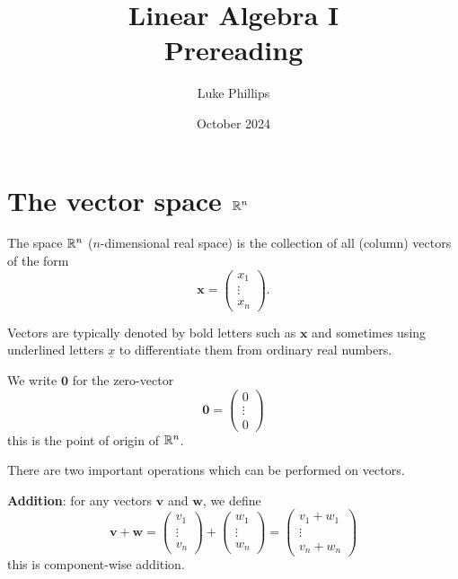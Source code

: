 \documentclass[10pt, a4paper]{article}
\title{Linear Algebra I \\
    \large Prereading}
\author{Luke Phillips}
\date{October 2024}
\begin{document}
\maketitle

\newpage

\tableofcontents

\newpage

\section{The vector space \(\mathbb{R} ^ n\)}
\begin{definition}
    The space $\mathbb{R} ^ n$ ($n$-dimensional real space) is the collection of all (column) vectors of the form
    \[
    \mathbf{x} =
    \begin{pmatrix}
        x_1 \\
        \vdots \\
        x_n
    \end{pmatrix}.
    \]
\end{definition}
Vectors are typically denoted by bold letters such as $\mathbf{x}$ and sometimes using underlined letters $\underline{x}$ to differentiate them from ordinary real numbers.

We write $\mathbf{0}$ for the zero-vector
\[
\mathbf{0} = \begin{pmatrix}
    0 \\
    \vdots \\
    0
\end{pmatrix}
\]
this is the point of origin of $\mathbb{R} ^ n$.

There are two important operations which can be performed on vectors.

\textbf{Addition}: for any vectors $\mathbf{v}$ and $\mathbf{w}$, we define
\[
\mathbf{v + w} =
\begin{pmatrix}
    v_1 \\
    \vdots \\
    v_n
\end{pmatrix}
+
\begin{pmatrix}
    w_1 \\
    \vdots \\
    w_n
\end{pmatrix}
=
\begin{pmatrix}
    v_1 + w_1 \\
    \vdots \\
    v_n + w_n
\end{pmatrix}
\]
this is component-wise addition.
\end{document}
